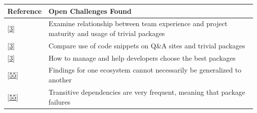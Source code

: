\documentclass[]{book}
\begin{document}
\begin{longtable}[]{@{}ll@{}}
\toprule
\begin{minipage}[b]{0.13\columnwidth}\raggedright\strut
Reference\strut
\end{minipage} & \begin{minipage}[b]{0.29\columnwidth}\raggedright\strut
Open Challenges Found\strut
\end{minipage}\tabularnewline
\midrule
\endhead
\begin{minipage}[t]{0.13\columnwidth}\raggedright\strut
{[}\protect\hyperlink{ref-Abdalkareem2017}{3}{]}\strut
\end{minipage} & \begin{minipage}[t]{0.29\columnwidth}\raggedright\strut
Examine relationship between team experience and project maturity and
usage of trivial packages\strut
\end{minipage}\tabularnewline
\begin{minipage}[t]{0.13\columnwidth}\raggedright\strut
{[}\protect\hyperlink{ref-Abdalkareem2017}{3}{]}\strut
\end{minipage} & \begin{minipage}[t]{0.29\columnwidth}\raggedright\strut
Compare use of code snippets on Q\&A sites and trivial packages\strut
\end{minipage}\tabularnewline
\begin{minipage}[t]{0.13\columnwidth}\raggedright\strut
{[}\protect\hyperlink{ref-Abdalkareem2017}{3}{]}\strut
\end{minipage} & \begin{minipage}[t]{0.29\columnwidth}\raggedright\strut
How to manage and help developers choose the best packages\strut
\end{minipage}\tabularnewline
\begin{minipage}[t]{0.13\columnwidth}\raggedright\strut
{[}\protect\hyperlink{ref-Decan2018}{55}{]}\strut
\end{minipage} & \begin{minipage}[t]{0.29\columnwidth}\raggedright\strut
Findings for one ecosystem cannot necessarily be generalized to
another\strut
\end{minipage}\tabularnewline
\begin{minipage}[t]{0.13\columnwidth}\raggedright\strut
{[}\protect\hyperlink{ref-Decan2018}{55}{]}\strut
\end{minipage} & \begin{minipage}[t]{0.29\columnwidth}\raggedright\strut
Transitive dependencies are very frequent, meaning that package failures

\end{minipage}
\end{longtable}
\end{document}
